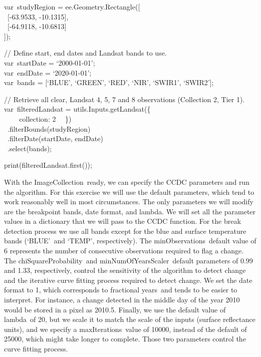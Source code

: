 \documentclass[
  letterpaper,
  DIV=11,
  numbers=noendperiod]{scrreprt}
\begin{document}
var~studyRegion = ee.Geometry.Rectangle({[}\\
\hspace*{0.333em} ~{[}-63.9533, -10.1315{]},\\
\hspace*{0.333em} ~{[}-64.9118, -10.6813{]}\\
{]});

// Define start, end dates and Landsat bands to use.\\
var~startDate = `2000-01-01';\\
var~endDate = `2020-01-01';\\
var~bands = {[}`BLUE', `GREEN', `RED', `NIR', `SWIR1', `SWIR2'{]};

// Retrieve all clear, Landsat 4, 5, 7 and 8 observations (Collection 2,
Tier 1).\\
var~filteredLandsat = utils.Inputs.getLandsat(\{\\
\hspace*{0.333em} ~ ~ ~collection: 2~ ~\})\\
\hspace*{0.333em} ~.filterBounds(studyRegion)\\
\hspace*{0.333em} ~.filterDate(startDate, endDate)\\
\hspace*{0.333em} ~.select(bands);

print(filteredLandsat.first());

With the ImageCollection~ready, we can specify the CCDC parameters and
run the algorithm. For this exercise we will use the default parameters,
which tend to work reasonably well in most circumstances. The only
parameters we will modify are the breakpoint bands, date format, and
lambda. We will set all the parameter values in a dictionary that we
will pass to the CCDC function. For the break detection process we use
all bands except for the blue and surface temperature bands (`BLUE'~and
`TEMP', respectively). The minObservations~default value of 6 represents
the number of consecutive observations required to flag a change. The
chiSquareProbability~and minNumOfYearsScaler~default parameters of 0.99
and 1.33, respectively, control the sensitivity of the algorithm to
detect change and the iterative curve fitting process required to detect
change. We set the date format to 1, which corresponds to fractional
years~and tends to be easier to interpret. For instance, a change
detected in the middle day of the year 2010 would be stored in a pixel
as 2010.5. Finally, we use the default value of lambda~of 20, but we
scale it to match the scale of the inputs (surface reflectance units),
and we specify a maxIterations~value of 10000, instead of the default of
25000, which might take longer to complete. Those two parameters control
the curve fitting process.
\end{document}
